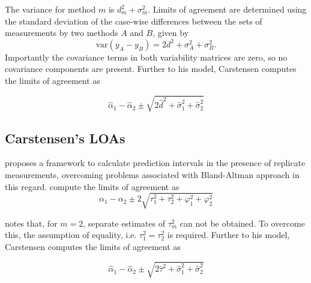 \documentclass[12pt, a4paper]{report}
\theoremstyle{plain}
\theoremstyle{definition}
\theoremstyle{remark}
\begin{document}
The variance for method $m$ is $d^2_{m}+\sigma^2_{m}$. Limits of agreement are determined using the standard deviation of the case-wise differences between the sets of measurements by two methods $A$ and $B$, given by
\begin{equation}
\mbox{var} (y_{A}-y_{B}) = 2d^2 + \sigma^2_{A}+ \sigma^2_{B}.
\end{equation}
Importantly the covariance terms in both variability matrices are zero, so no covariance components are present. Further to his model, Carstensen computes the limits of agreement
as

\[
\hat{\alpha}_1 - \hat{\alpha}_2 \pm \sqrt{2 \hat{d}^2 + \hat{\sigma}^2_1 + \hat{\sigma}^2_2}
\]






\subsection{Carstensen's LOAs}
\citet{BXC2008} proposes a framework to calculate prediction intervals in the presence of replicate measurements, overcoming problems associated with Bland-Altman approach in this regard. \citet{BXC2008} compute the limits of agreement as
\[
\alpha_1 - \alpha_2 \pm 2 \sqrt{ \tau^2_1 +  \tau^2_2 +  \varphi^2_1 +  \varphi^2_2 }
\]

\citet{BXC2008} notes that, for $m=2$, separate estimates of $\tau^2_m$ can not be obtained. To overcome this, the assumption of equality, i.e. $\tau^2_1 = \tau^2_2$ is required. Further to his model, Carstensen computes the limits of agreement
as

\[
\hat{\alpha}_1 - \hat{\alpha}_2 \pm \sqrt{2 \hat{\tau}^2 +
\hat{\sigma}^2_1 + \hat{\sigma}^2_2}
\]






\end{document}
